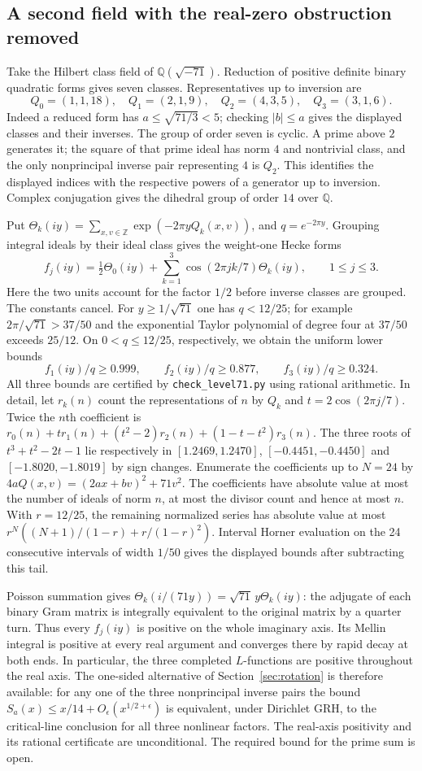 \subsection*{A second field with the real-zero obstruction removed}
Take the Hilbert class field of $\mathbb Q(\sqrt{-71})$. Reduction of positive definite binary quadratic forms gives seven classes. Representatives up to inversion are
\[
 Q_0=(1,1,18),\quad Q_1=(2,1,9),\quad Q_2=(4,3,5),\quad Q_3=(3,1,6).
\]
Indeed a reduced form has $a\le\sqrt{71/3}<5$; checking $|b|\le a$ gives the displayed classes and their inverses. The group of order seven is cyclic. A prime above $2$ generates it; the square of that prime ideal has norm $4$ and nontrivial class, and the only nonprincipal inverse pair representing $4$ is $Q_2$. This identifies the displayed indices with the respective powers of a generator up to inversion. Complex conjugation gives the dihedral group of order $14$ over $\mathbb Q$.

Put $\Theta_k(iy)=\sum_{x,v\in\mathbb Z}\exp(-2\pi yQ_k(x,v))$, and $q=e^{-2\pi y}$. Grouping integral ideals by their ideal class gives the weight-one Hecke forms
\[
 f_j(iy)=\tfrac12\Theta_0(iy)+
   \sum_{k=1}^3\cos(2\pi jk/7)\Theta_k(iy),\qquad 1\le j\le3.
\]
Here the two units account for the factor $1/2$ before inverse classes are grouped. The constants cancel. For $y\ge1/\sqrt{71}$ one has $q<12/25$; for example $2\pi/\sqrt{71}>37/50$ and the exponential Taylor polynomial of degree four at $37/50$ exceeds $25/12$. On $0<q\le12/25$, respectively, we obtain the uniform lower bounds
\[
             f_1(iy)/q\ge0.999,\qquad f_2(iy)/q\ge0.877,\qquad f_3(iy)/q\ge0.324.
\]
All three bounds are certified by \texttt{check\_level71.py} using rational arithmetic. In detail, let $r_k(n)$ count the representations of $n$ by $Q_k$ and $t=2\cos(2\pi j/7)$. Twice the $n$th coefficient is
$r_0(n)+t r_1(n)+(t^2-2)r_2(n)+(1-t-t^2)r_3(n)$.
The three roots of $t^3+t^2-2t-1$ lie respectively in
$[1.2469,1.2470]$, $[-0.4451,-0.4450]$ and $[-1.8020,-1.8019]$ by sign changes. Enumerate the coefficients up to $N=24$ by
$4aQ(x,v)=(2ax+bv)^2+71v^2$. The coefficients have absolute value at most the number of ideals of norm $n$, at most the divisor count and hence at most $n$. With $r=12/25$, the remaining normalized series has absolute value at most $r^N((N+1)/(1-r)+r/(1-r)^2)$. Interval Horner evaluation on the 24 consecutive intervals of width $1/50$ gives the displayed bounds after subtracting this tail.

Poisson summation gives $\Theta_k(i/(71y))=\sqrt{71}\,y\Theta_k(iy)$: the adjugate of each binary Gram matrix is integrally equivalent to the original matrix by a quarter turn. Thus every $f_j(iy)$ is positive on the whole imaginary axis. Its Mellin integral is positive at every real argument and converges there by rapid decay at both ends. In particular, the three completed $L$-functions are positive throughout the real axis. The one-sided alternative of Section~\ref{sec:rotation} is therefore available: for any one of the three nonprincipal inverse pairs the bound $S_a(x)\le x/14+O_\epsilon(x^{1/2+\epsilon})$ is equivalent, under Dirichlet GRH, to the critical-line conclusion for all three nonlinear factors. The real-axis positivity and its rational certificate are unconditional. The required bound for the prime sum is open.
